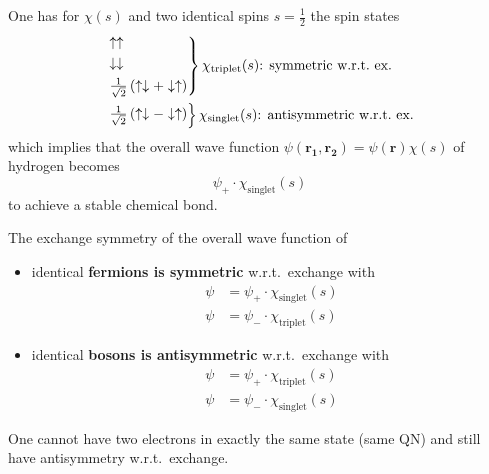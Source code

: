 \newpar{}

One has for $\chi(s)$ and two identical spins $s=\frac{1}{2}$ the spin states
\begin{align*}
     & \begin{rcases}
           \uparrow \uparrow                                                        \\
           \downarrow \downarrow                                                    \\
           \frac{1}{\sqrt{2}}\left(\uparrow \downarrow + \downarrow \uparrow\right) \\
       \end{rcases} \chi_{\mathrm{triplet}}(s)\text{: symmetric w.r.t.\ ex.} \\
     & \begin{rcases}
           \frac{1}{\sqrt{2}}\left(\uparrow \downarrow - \downarrow \uparrow\right)
       \end{rcases} \chi_{\mathrm{singlet}}(s) \text{: antisymmetric w.r.t.\ ex.}
\end{align*}
which implies that the overall wave function $\psi(\mathbf{r_1},\mathbf{r_2})=\psi(\mathbf{r})\chi(s)$ of hydrogen becomes
\begin{equation*}
    \psi_{+}\cdot \chi_{\mathrm{singlet}}(s)
\end{equation*}
to achieve a stable chemical bond.

\newpar{}

The exchange symmetry of the overall wave function of
\begin{itemize}
    \item identical \textbf{fermions is symmetric} w.r.t.\ exchange with
          \begin{align*}
              \psi & = \psi_{+}\cdot \chi_{\mathrm{singlet}}(s) \\
              \psi & = \psi_{-}\cdot \chi_{\mathrm{triplet}}(s)
          \end{align*}
    \item identical \textbf{bosons is antisymmetric} w.r.t.\ exchange with
          \begin{align*}
              \psi & = \psi_{+}\cdot \chi_{\mathrm{triplet}}(s) \\
              \psi & = \psi_{-}\cdot \chi_{\mathrm{singlet}}(s)
          \end{align*}
\end{itemize}

\newpar{}

One cannot have two electrons in exactly the same state (same QN) and still have antisymmetry w.r.t.\ exchange.
